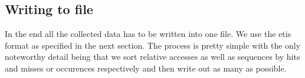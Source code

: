 \subsection{Writing to file}

In the end all the collected data has to be written into one file. We use the etis format as specified in the next section. The process is pretty simple with the only noteworthy detail being that we sort relative accesses
as well as sequences by hits and misses or occurences respectively and then write out as many as possible.